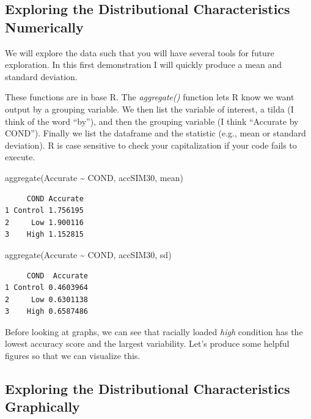 \documentclass[
  11pt,
]{book}
\newenvironment{Shaded}{\begin{snugshade}}{\end{snugshade}}
\newcommand{\FunctionTok}[1]{\textcolor[rgb]{0.00,0.00,0.00}{#1}}
\newcommand{\NormalTok}[1]{#1}
\newcommand{\SpecialCharTok}[1]{\textcolor[rgb]{0.00,0.00,0.00}{#1}}
\begin{document}
\hypertarget{exploring-the-distributional-characteristics-numerically}{%
\subsection{Exploring the Distributional Characteristics Numerically}\label{exploring-the-distributional-characteristics-numerically}}

We will explore the data such that you will have several tools for future exploration. In this first demonstration I will quickly produce a mean and standard deviation.

These functions are in base R. The \emph{aggregate()} function lets R know we want output by a grouping variable. We then list the variable of interest, a tilda (I think of the word ``by''), and then the grouping variable (I think ``Accurate by COND''). Finally we list the dataframe and the statistic (e.g., mean or standard deviation). R is case sensitive to check your capitalization if your code fails to execute.

\begin{Shaded}
\begin{Highlighting}[]
\FunctionTok{aggregate}\NormalTok{(Accurate }\SpecialCharTok{\textasciitilde{}}\NormalTok{ COND, accSIM30, mean)}
\end{Highlighting}
\end{Shaded}

\begin{verbatim}
     COND Accurate
1 Control 1.756195
2     Low 1.900116
3    High 1.152815
\end{verbatim}

\begin{Shaded}
\begin{Highlighting}[]
\FunctionTok{aggregate}\NormalTok{(Accurate }\SpecialCharTok{\textasciitilde{}}\NormalTok{ COND, accSIM30, sd)}
\end{Highlighting}
\end{Shaded}

\begin{verbatim}
     COND  Accurate
1 Control 0.4603964
2     Low 0.6301138
3    High 0.6587486
\end{verbatim}

Before looking at graphs, we can see that racially loaded \emph{high} condition has the lowest accuracy score and the largest variability. Let's produce some helpful figures so that we can visualize this.

\hypertarget{exploring-the-distributional-characteristics-graphically}{%
\subsection{Exploring the Distributional Characteristics Graphically}\label{exploring-the-distributional-characteristics-graphically}}
\end{document}
